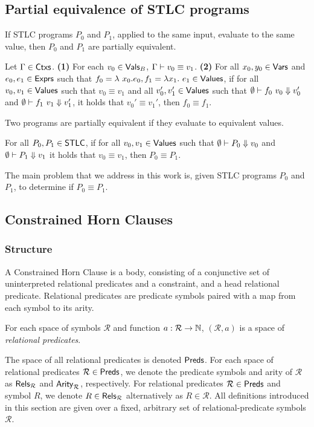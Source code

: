 \subsection{Partial equivalence of STLC programs}
\label{sec:peq}
%
If STLC programs $P_0$ and $P_1$, applied to the same input, evaluate
to the same value, then $P_0$ and $P_1$ are partially equivalent.
%
\begin{defn}
  \label{defn:val-equiv}
  Let $\Gamma \in \mathsf{Ctxs}$.
  \textbf{(1)} For each $v_0 \in \mathsf{Vals}_B$, $\Gamma \vdash
  v_0 \equiv v_1$.
  \textbf{(2)} For all $x_0, y_0 \in \mathsf{Vars}$ and $e_0, e_1 \in \mathsf{Exprs}$
  such that $f_0 = \lambda\ x_0. e_0, f_1 = \lambda x_1.\ e_1 \in
  \mathsf{Values}$, if for all $v_0, v_1 \in \mathsf{Values}$ such that $v_0 \equiv
  v_1$ and %
  all $v_0', v_1' \in \mathsf{Values}$ such that $\emptyset \vdash f_0\ v_0
  \Downarrow v_0'$ and $\emptyset \vdash f_1\ v_1 \Downarrow v_1'$, it
  holds that $v_0' \equiv v_1'$, then %
  $f_0 \equiv f_1$.
\end{defn}

%
Two programs are partially equivalent if they evaluate to equivalent
values.
%
\begin{defn}
  \label{defn:prog-equiv}
  For all $P_0, P_1 \in \mathsf{STLC}$, if for all $v_0, v_1 \in \mathsf{Values}$ such
  that $\emptyset \vdash P_0 \Downarrow v_0$ and $\emptyset \vdash
  P_1 \Downarrow v_1$ it holds that $v_0 \equiv v_1$, then $P_0 \equiv
  P_1$.
\end{defn}
%
The main problem that we address in this work is, given STLC programs
$P_0$ and $P_1$, to determine if $P_0 \equiv P_1$.

\subsection{Constrained Horn Clauses}
\label{sec:chcs}

\subsubsection{Structure}
A Constrained Horn Clause is a body, consisting of a conjunctive set
of uninterpreted relational predicates and a constraint, and a head
relational predicate.
%
Relational predicates are predicate symbols paired with a map from
each symbol to its arity.
%
\begin{defn}
  \label{defn:rel-preds}
  For each space of symbols $\mathcal{R}$ and function $a: \mathcal{R}
  \to \mathbb{N}$, $(\mathcal{R}, a)$ is a space of \emph{relational
    predicates}.
\end{defn}
%
The space of all relational predicates is denoted $\mathsf{Preds}$.
%
For each space of relational predicates $\mathcal{R} \in \mathsf{Preds}$,
we denote the predicate symbols and arity of $\mathcal{R}$ as
$\mathsf{Rels}_{\mathcal{R}}$ and $\mathsf{Arity}_{\mathcal{R}}$, respectively.
%
For relational predicates $\mathcal{R} \in \mathsf{Preds}$ and symbol $R$,
we denote $R \in \mathsf{Rels}_{ \mathcal{R} }$ alternatively as $R \in
\mathcal{R}$.
%
All definitions introduced in this section are given over a fixed,
arbitrary set of relational-predicate symbols $\mathcal{R}$.

